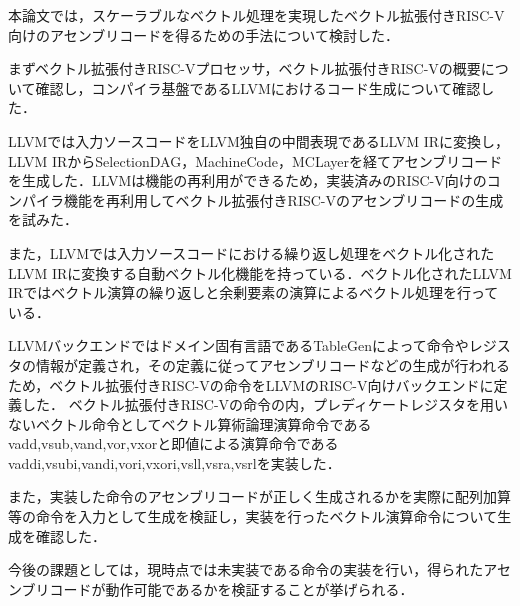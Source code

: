 
本論文では，スケーラブルなベクトル処理を実現したベクトル拡張付きRISC-V向けのアセンブリコードを得るための手法について検討した．

まずベクトル拡張付きRISC-Vプロセッサ，ベクトル拡張付きRISC-Vの概要について確認し，コンパイラ基盤であるLLVMにおけるコード生成について確認した．

LLVMでは入力ソースコードをLLVM独自の中間表現であるLLVM IRに変換し，LLVM IRからSelectionDAG，MachineCode，MCLayerを経てアセンブリコードを生成した．LLVMは機能の再利用ができるため，実装済みのRISC-V向けのコンパイラ機能を再利用してベクトル拡張付きRISC-Vのアセンブリコードの生成を試みた．

また，LLVMでは入力ソースコードにおける繰り返し処理をベクトル化されたLLVM IRに変換する自動ベクトル化機能を持っている．ベクトル化されたLLVM IRではベクトル演算の繰り返しと余剰要素の演算によるベクトル処理を行っている．

LLVMバックエンドではドメイン固有言語であるTableGenによって命令やレジスタの情報が定義され，その定義に従ってアセンブリコードなどの生成が行われるため，ベクトル拡張付きRISC-Vの命令をLLVMのRISC-V向けバックエンドに定義した．
ベクトル拡張付きRISC-Vの命令の内，プレディケートレジスタを用いないベクトル命令としてベクトル算術論理演算命令であるvadd,vsub,vand,vor,vxorと即値による演算命令であるvaddi,vsubi,vandi,vori,vxori,vsll,vsra,vsrlを実装した．


また，実装した命令のアセンブリコードが正しく生成されるかを実際に配列加算等の命令を入力として生成を検証し，実装を行ったベクトル演算命令について生成を確認した．

今後の課題としては，現時点では未実装である命令の実装を行い，得られたアセンブリコードが動作可能であるかを検証することが挙げられる．
